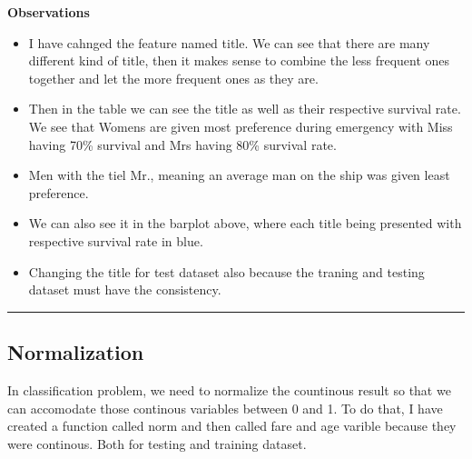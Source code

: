\documentclass[]{article}
\providecommand{\tightlist}{%
  \setlength{\itemsep}{0pt}\setlength{\parskip}{0pt}}
\begin{document}
\textbf{Observations}

\begin{itemize}
\tightlist
\item
  I have cahnged the feature named title. We can see that there are many
  different kind of title, then it makes sense to combine the less
  frequent ones together and let the more frequent ones as they are.
\item
  Then in the table we can see the title as well as their respective
  survival rate. We see that Womens are given most preference during
  emergency with Miss having 70\% survival and Mrs having 80\% survival
  rate.
\item
  Men with the tiel Mr., meaning an average man on the ship was given
  least preference.
\item
  We can also see it in the barplot above, where each title being
  presented with respective survival rate in blue.
\item
  Changing the title for test dataset also because the traning and
  testing dataset must have the consistency.
\end{itemize}

\begin{center}\rule{0.5\linewidth}{\linethickness}\end{center}

\subsection{Normalization}\label{normalization}

In classification problem, we need to normalize the countinous result so
that we can accomodate those continous variables between 0 and 1. To do
that, I have created a function called norm and then called fare and age
varible because they were continous. Both for testing and training
dataset.
\end{document}

